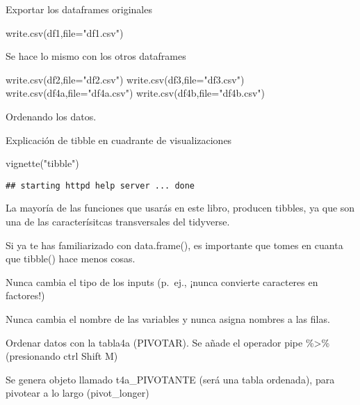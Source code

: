 \documentclass[
]{article}
\newenvironment{Shaded}{\begin{snugshade}}{\end{snugshade}}
\newcommand{\AttributeTok}[1]{\textcolor[rgb]{0.77,0.63,0.00}{#1}}
\newcommand{\FunctionTok}[1]{\textcolor[rgb]{0.00,0.00,0.00}{#1}}
\newcommand{\NormalTok}[1]{#1}
\newcommand{\StringTok}[1]{\textcolor[rgb]{0.31,0.60,0.02}{#1}}
\begin{document}
Exportar los dataframes originales

\begin{Shaded}
\begin{Highlighting}[]
\FunctionTok{write.csv}\NormalTok{(df1,}\AttributeTok{file=}\StringTok{"df1.csv"}\NormalTok{)}
\end{Highlighting}
\end{Shaded}

Se hace lo mismo con los otros dataframes

\begin{Shaded}
\begin{Highlighting}[]
\FunctionTok{write.csv}\NormalTok{(df2,}\AttributeTok{file=}\StringTok{"df2.csv"}\NormalTok{)}
\FunctionTok{write.csv}\NormalTok{(df3,}\AttributeTok{file=}\StringTok{"df3.csv"}\NormalTok{)}
\FunctionTok{write.csv}\NormalTok{(df4a,}\AttributeTok{file=}\StringTok{"df4a.csv"}\NormalTok{)}
\FunctionTok{write.csv}\NormalTok{(df4b,}\AttributeTok{file=}\StringTok{"df4b.csv"}\NormalTok{)}
\end{Highlighting}
\end{Shaded}

Ordenando los datos.

Explicación de tibble en cuadrante de visualizaciones

\begin{Shaded}
\begin{Highlighting}[]
\FunctionTok{vignette}\NormalTok{(}\StringTok{"tibble"}\NormalTok{)}
\end{Highlighting}
\end{Shaded}

\begin{verbatim}
## starting httpd help server ... done
\end{verbatim}

La mayoría de las funciones que usarás en este libro, producen tibbles,
ya que son una de las caracterísitcas transversales del tidyverse.

Si ya te has familiarizado con data.frame(), es importante que tomes en
cuanta que tibble() hace menos cosas.

Nunca cambia el tipo de los inputs (p.~ej., ¡nunca convierte caracteres
en factores!)

Nunca cambia el nombre de las variables y nunca asigna nombres a las
filas.

Ordenar datos con la tabla4a (PIVOTAR). Se añade el operador pipe
\%\textgreater\% (presionando ctrl Shift M)

Se genera objeto llamado t4a\_PIVOTANTE (será una tabla ordenada), para
pivotear a lo largo (pivot\_longer)
\end{document}
